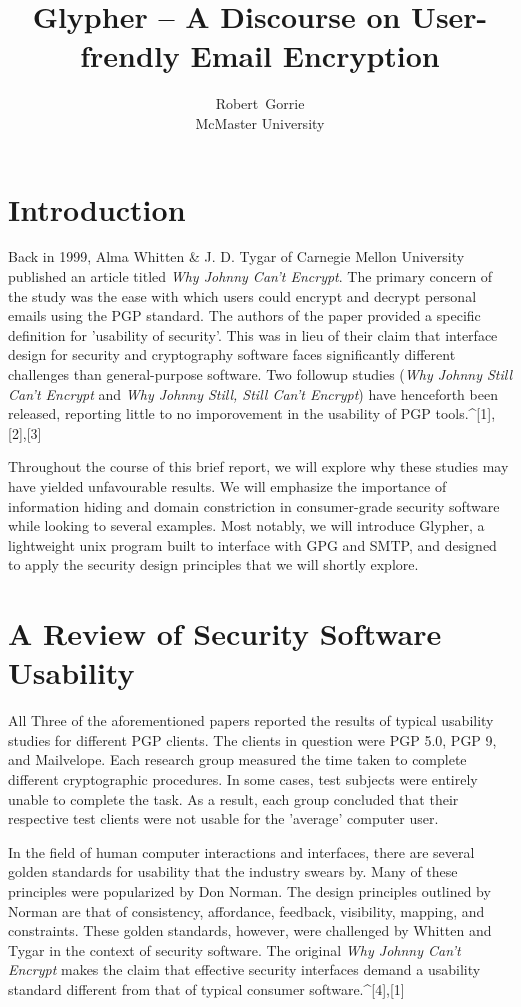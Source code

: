 \documentclass[journal]{IEEEtran}
\title{Glypher -- A Discourse on User-frendly Email Encryption}
\author{Robert~Gorrie \\ McMaster University}
\begin{document}
\maketitle
 
\section{Introduction}
Back in 1999, Alma Whitten \& J. D. Tygar of Carnegie Mellon University published an article titled \textit{Why Johnny Can't Encrypt}. The primary concern of the study was the ease with which users could encrypt and decrypt personal emails using the PGP standard. The authors of the paper provided a specific definition for 'usability of security'. This was in lieu of their claim that interface design for security and cryptography software faces significantly different challenges than general-purpose software. Two followup studies (\textit{Why Johnny Still Can't Encrypt} and \textit{Why Johnny Still, Still Can't Encrypt}) have henceforth been released, reporting little to no imporovement in the usability of PGP tools.^{[1],[2],[3]}

Throughout the course of this brief report, we will explore why these studies may have yielded unfavourable results. We will emphasize the importance of information hiding and domain constriction in consumer-grade security software while looking to several examples. Most notably, we will introduce Glypher, a lightweight unix program built to interface with GPG and SMTP, and designed to apply the security design principles that we will shortly explore.

\section{A Review of Security Software Usability}
All Three of the aforementioned papers reported the results of typical usability studies for different PGP clients. The clients in question were PGP 5.0, PGP 9, and Mailvelope. Each research group measured the time taken to complete different cryptographic procedures. In some cases, test subjects were entirely unable to complete the task. As a result, each group concluded that their respective test clients were not usable for the 'average' computer user.

In the field of human computer interactions and interfaces, there are several golden standards for usability that the industry swears by. Many of these principles were popularized by Don Norman. The design principles outlined by Norman are that of consistency, affordance, feedback, visibility, mapping, and constraints. These golden standards, however, were challenged by Whitten and Tygar in the context of security software. The original \textit{Why Johnny Can't Encrypt} makes the claim that effective security interfaces demand a usability standard different from that of typical consumer software.^{[4],[1]}
\end{document}
